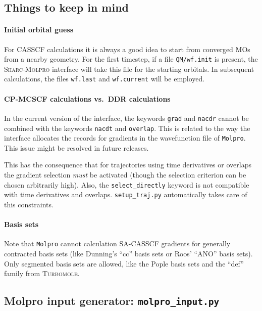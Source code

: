 \documentclass[a4paper,11pt,DIV=15,openany,twoside=false]{scrbook}
\newcommand{\sharc}{\textsc{Sharc}}
\newcommand{\ttt}[1]{\texttt{#1}}
\begin{document}
\subsection{Things to keep in mind}

\paragraph{Initial orbital guess}

For CASSCF calculations it is always a good idea to start from converged MOs from a nearby geometry. For the first timestep, if a file \ttt{QM/wf.init} is present, the \sharc-\textsc{Molpro} interface will take this file for the starting orbitals. In subsequent calculations, the files \ttt{wf.last} and \ttt{wf.current} will be employed.

\paragraph{CP-MCSCF calculations vs.\ DDR calculations}

In the current version of the interface, the keywords \ttt{grad} and \ttt{nacdr} cannot be combined with the keywords \ttt{nacdt} and \ttt{overlap}. This is related to the way the interface allocates the records for gradients in the wavefunction file of \ttt{Molpro}. This issue might be resolved in future releases.

This has the consequence that for trajectories using time derivatives or overlaps the gradient selection \textit{must} be activated (though the selection criterion can be chosen arbitrarily high). Also, the \ttt{select\_directly} keyword is not compatible with time derivatives and overlaps. \ttt{setup\_traj.py} automatically takes care of this constraints.

\paragraph{Basis sets}

Note that \ttt{Molpro} cannot calculation SA-CASSCF gradients for generally contracted basis sets (like Dunning's ``cc'' basis sets or Roos' ``ANO'' basis sets). Only segmented basis sets are allowed, like the Pople basis sets and the ``def'' family from \textsc{Turbomole}.

\subsection{Molpro input generator: \ttt{molpro\_input.py}}\label{sec:molpro_input.py}
\end{document}
